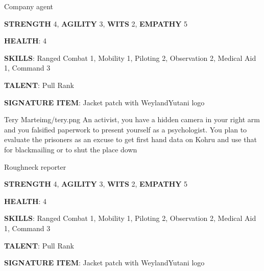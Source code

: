 \begin{rpg-commentbox}{}
    Company agent

    \textbf{STRENGTH} 4, \textbf{AGILITY} 3, \textbf{WITS} 2, \textbf{EMPATHY} 5

    \textbf{HEALTH}: 4

    \textbf{SKILLS}: Ranged Combat 1, Mobility 1, Piloting 2, Observation 2, Medical Aid 1, Command 3
    
    \textbf{TALENT}: Pull Rank
    
    \textbf{SIGNATURE ITEM}: Jacket patch with WeylandYutani logo    
\end{rpg-commentbox}


\newsect

\begin{rpg-pcbox}{Tery Marte}{img/tery.png}
    An activist, you have a hidden camera in your right arm and you falsified paperwork to present yourself as a psychologist. You plan to evaluate the prisoners as an excuse to get first hand data on Kohru and use that for blackmailing or to shut the place down
\end{rpg-pcbox}

\begin{rpg-commentbox}{}
    Roughneck reporter

    \textbf{STRENGTH} 4, \textbf{AGILITY} 3, \textbf{WITS} 2, \textbf{EMPATHY} 5

    \textbf{HEALTH}: 4

    \textbf{SKILLS}: Ranged Combat 1, Mobility 1, Piloting 2, Observation 2, Medical Aid 1, Command 3
    
    \textbf{TALENT}: Pull Rank
    
    \textbf{SIGNATURE ITEM}: Jacket patch with WeylandYutani logo    
\end{rpg-commentbox}

\newsect
